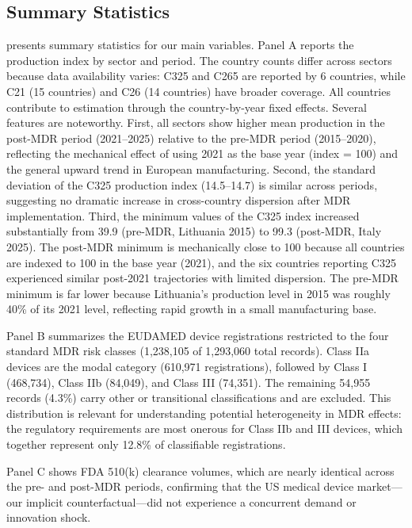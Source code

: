 \documentclass[12pt]{article}
\begin{document}
\subsection{Summary Statistics}

 presents summary statistics for our main variables. Panel A reports the production index by sector and period. The country counts differ across sectors because data availability varies: C325 and C265 are reported by 6 countries, while C21 (15 countries) and C26 (14 countries) have broader coverage. All countries contribute to estimation through the country-by-year fixed effects. Several features are noteworthy. First, all sectors show higher mean production in the post-MDR period (2021--2025) relative to the pre-MDR period (2015--2020), reflecting the mechanical effect of using 2021 as the base year (index = 100) and the general upward trend in European manufacturing. Second, the standard deviation of the C325 production index (14.5--14.7) is similar across periods, suggesting no dramatic increase in cross-country dispersion after MDR implementation. Third, the minimum values of the C325 index increased substantially from 39.9 (pre-MDR, Lithuania 2015) to 99.3 (post-MDR, Italy 2025). The post-MDR minimum is mechanically close to 100 because all countries are indexed to 100 in the base year (2021), and the six countries reporting C325 experienced similar post-2021 trajectories with limited dispersion. The pre-MDR minimum is far lower because Lithuania's production level in 2015 was roughly 40\% of its 2021 level, reflecting rapid growth in a small manufacturing base.

Panel B summarizes the EUDAMED device registrations restricted to the four standard MDR risk classes (1,238,105 of 1,293,060 total records). Class IIa devices are the modal category (610,971 registrations), followed by Class I (468,734), Class IIb (84,049), and Class III (74,351). The remaining 54,955 records (4.3\%) carry other or transitional classifications and are excluded. This distribution is relevant for understanding potential heterogeneity in MDR effects: the regulatory requirements are most onerous for Class IIb and III devices, which together represent only 12.8\% of classifiable registrations.

Panel C shows FDA 510(k) clearance volumes, which are nearly identical across the pre- and post-MDR periods, confirming that the US medical device market---our implicit counterfactual---did not experience a concurrent demand or innovation shock.
\end{document}
